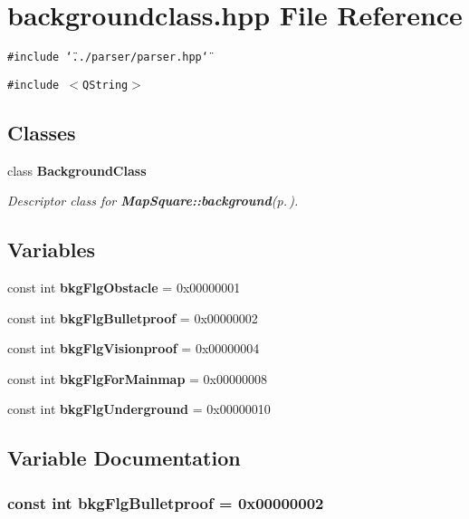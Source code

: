 \section{backgroundclass.hpp File Reference}
\label{backgroundclass_8hpp}
{\tt \#include \char`\"{}../parser/parser.hpp\char`\"{}}\par
{\tt \#include $<$QString$>$}\par
\subsection*{Classes}
\begin{CompactItemize}
\item 
class {\bf Background\-Class}
\begin{CompactList}\small\item\em Descriptor class for {\bf Map\-Square::background}{\rm (p.\,\pageref{classMapSquare_o0})}. \item\end{CompactList}\end{CompactItemize}
\subsection*{Variables}
\begin{CompactItemize}
\item 
const int {\bf bkg\-Flg\-Obstacle} = 0x00000001
\item 
const int {\bf bkg\-Flg\-Bulletproof} = 0x00000002
\item 
const int {\bf bkg\-Flg\-Visionproof} = 0x00000004
\item 
const int {\bf bkg\-Flg\-For\-Mainmap} = 0x00000008
\item 
const int {\bf bkg\-Flg\-Underground} = 0x00000010
\end{CompactItemize}


\subsection{Variable Documentation}
\subsubsection{\setlength{\rightskip}{0pt plus 5cm}const int {\bf bkg\-Flg\-Bulletproof} = 0x00000002}\label{backgroundclass_8hpp_a1}


